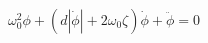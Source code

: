\begin{equation} \label{eq:roll_decay_equation_quadratic}
\omega_{0}^{2} \phi + \left(d \left|{\dot{\phi}}\right| + 2 \omega_{0} \zeta\right) \dot{\phi} + \ddot{\phi} = 0
\end{equation}
